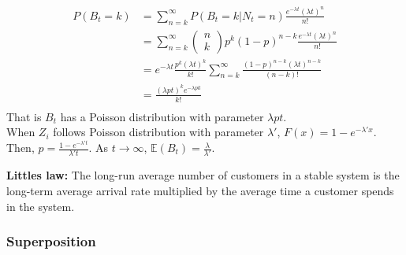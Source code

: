 \documentclass[11pt,a4paper]{article}
\begin{document}
\begin{equation}
    \begin{aligned}
        P(B_t=k)
        &=\sum_{n=k}^\infty P(B_t=k|N_t=n)\frac{e^{-\lambda t}(\lambda t)^n}{n!}\\
        &=\sum_{n=k}^\infty \begin{pmatrix}
            n\\
            k
        \end{pmatrix}p^k(1-p)^{n-k}\frac{e^{-\lambda t}(\lambda t)^n}{n!}\\
        &=e^{-\lambda t}\frac{p^k(\lambda t)^k}{k!}\sum_{n=k}^\infty\frac{(1-p)^{n-k}(\lambda t)^{n-k}}{(n-k)!}\\
        &=\frac{(\lambda p t)^ke^{-\lambda pk}}{k!}\\
    \end{aligned}
    \nonumber
\end{equation}
That is $B_t$ has a Poisson distribution with parameter $\lambda p t$.\\
When $Z_i$ follows Poisson distribution with parameter $\lambda'$, $F(x)=1-e^{-\lambda'x}$. Then, $p=\frac{1-e^{-\lambda't}}{\lambda't}$. As $t \rightarrow \infty$, $\mathbb{E}(B_t)=\frac{\lambda}{\lambda'}$.

\textbf{Littles law:} The long-run average number of customers in a stable system is the long-term average arrival rate multiplied by the average time a customer spends in the system.

\subsubsection{Superposition}
\end{document}
